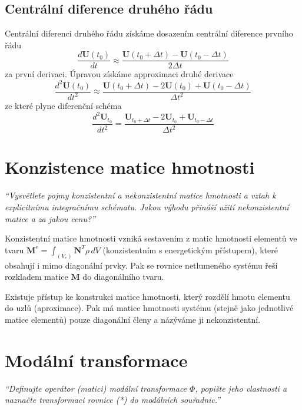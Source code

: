 \documentclass{article}
\begin{document}
	\subsection{Centrální diference druhého řádu}

	Centrální diferenci druhého řádu získáme dosazením centrální diference prvního řádu
	\begin{equation}
		\frac{d\bm{U}(t_0)}{dt} \approx \frac{\bm{U}(t_0+\Delta t) - \bm{U}(t_0-\Delta t)}{2\Delta t}
	\end{equation}
	za první derivaci.
	Úpravou získáme approximaci druhé derivace
	\begin{equation}
		\frac{d^2\bm{U}(t_0)}{dt^2}
		\approx
		\frac{ \bm{U}(t_0+\Delta t) - 2\bm{U}(t_0) + \bm{U}(t_0-\Delta t) }{\Delta t^2}
	\end{equation}
	ze které plyne diferenční schéma
	\begin{equation}
		\frac{d^2\bm{U}_{t_0}}{dt^2}
		=
		\frac{\bm{U}_{t_0+\Delta t} - 2\bm{U}_{t_0} + \bm{U}_{t_0-\Delta t}}{\Delta t^2}
	\end{equation}

	\section{Konzistence matice hmotnosti}
	\emph{``Vysvětlete pojmy konzistentní a nekonzistentní matice hmotnosti a vztah k explicitnímu integračnímu schématu. Jakou výhodu přináší užití nekonzistentní matice a za jakou cenu?''}

	Konzistentní matice hmotnosti vzniká sestavením z matic hmotnosti elementů ve tvaru $\bm{M}^e = \int_{(V_e)} \bm{N}^T \rho \, dV$ (konzistentním s energetickým přístupem), které obsahují i mimo diagonální prvky. Pak se rovnice netlumeného systému řeší rozkladem matice $\bm{M}$ do diagonálního tvaru.

	Existuje přístup ke konstrukci matice hmotnosti, který rozdělí hmotu elementu do uzlů (aproximace). Pak má matice hmotnosti systému (stejně jako jednotlivé matice elementů) pouze diagonální členy a názýváme ji nekonzistentní.

	\section{Modální transformace}
	\emph{``Definujte operátor (matici) modální transformace $\Phi$, popište jeho vlastnosti a naznačte transformaci rovnice (*) do modálních souřadnic.''}
\end{document}
